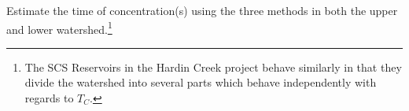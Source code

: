 \documentclass[12pt]{article}
\begin{document}
\begin{enumerate}
Estimate the time of concentration(s) using the three methods in both the upper and lower watershed.\footnote{The SCS Reservoirs in the Hardin Creek project behave similarly in that they divide the watershed into several parts which behave independently with regards to $T_C$.}

\end{enumerate}


\end{document}
